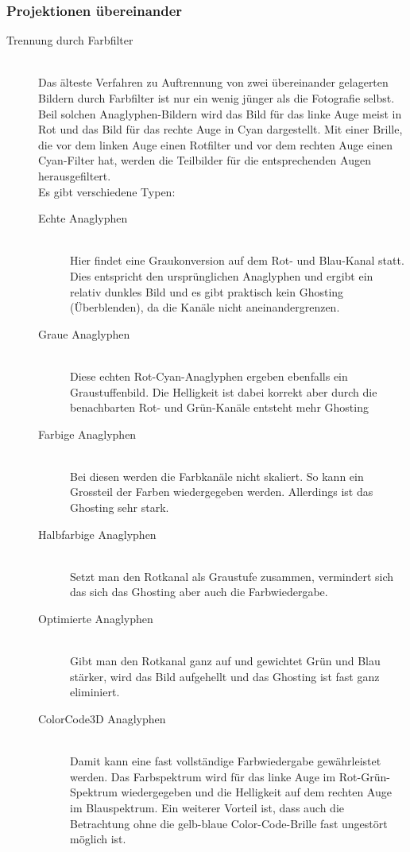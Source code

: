 \documentclass[10pt]{article}
\begin{document}
\subsubsection{Projektionen übereinander}
\begin{description}
	\item[Trennung durch Farbfilter] \hfill \\
		Das älteste Verfahren zu Auftrennung von zwei übereinander gelagerten Bildern durch Farbfilter ist nur ein wenig jünger als die Fotografie selbst. Beil solchen Anaglyphen-Bildern wird das Bild für das linke Auge meist in Rot und das Bild für das rechte Auge in Cyan dargestellt. Mit einer Brille, die vor dem linken Auge einen Rotfilter und vor dem rechten Auge einen Cyan-Filter hat, werden die Teilbilder für die entsprechenden Augen herausgefiltert. \\
		Es gibt verschiedene Typen:
		\begin{description}
			\item[Echte Anaglyphen] \hfill \\
				Hier findet eine Graukonversion auf dem Rot- und Blau-Kanal statt. Dies entspricht den ursprünglichen Anaglyphen und ergibt ein relativ dunkles Bild und es gibt praktisch kein Ghosting (Überblenden), da die Kanäle nicht aneinandergrenzen.
			\item[Graue Anaglyphen] \hfill \\
				Diese echten Rot-Cyan-Anaglyphen ergeben ebenfalls ein Graustuffenbild. Die Helligkeit ist dabei korrekt aber durch die benachbarten Rot- und Grün-Kanäle entsteht mehr Ghosting
			\item[Farbige Anaglyphen] \hfill \\
				Bei diesen werden die Farbkanäle nicht skaliert. So kann ein Grossteil der Farben wiedergegeben werden. Allerdings ist das Ghosting sehr stark.
			\item[Halbfarbige Anaglyphen] \hfill \\
				Setzt man den Rotkanal als Graustufe zusammen, vermindert sich das sich das Ghosting aber auch die Farbwiedergabe.
			\item[Optimierte Anaglyphen] \hfill \\
				Gibt man den Rotkanal ganz auf und gewichtet Grün und Blau stärker, wird das Bild aufgehellt und das Ghosting ist fast ganz eliminiert.
			\item[ColorCode3D Anaglyphen] \hfill \\
				Damit kann eine fast vollständige Farbwiedergabe gewährleistet werden. Das Farbspektrum wird für das linke Auge im Rot-Grün-Spektrum wiedergegeben und die Helligkeit auf dem rechten Auge im Blauspektrum. Ein weiterer Vorteil ist, dass auch die Betrachtung ohne die gelb-blaue Color-Code-Brille fast ungestört möglich ist.

\end{description}
\end{description}
\end{document}
